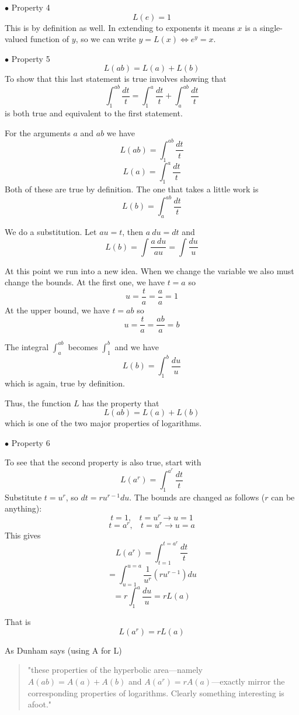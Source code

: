 \documentclass[11pt, oneside]{article}
\begin{document}
$\bullet  $ Property 4
\[ L(e) = 1 \]
This is by definition as well.  In extending to exponents it means $x$ is a single-valued function of $y$, so we can write $y = L(x) \iff e^y = x$.

$\bullet  $ Property 5
\[ L(ab) = L(a) + L(b)  \]
To show that this last statement is true involves showing that
\[ \int_1^{ab} \frac{dt}{t} = \int_1^{a} \frac{dt}{t} + \int_a^{ab} \frac{dt}{t} \]
is both true and equivalent to the first statement.

For the arguments $a$ and $ab$ we have 
\[ L(ab) = \int_1^{ab} \frac{dt}{t}   \]
\[ L(a) = \int_1^{a} \frac{dt}{t}   \]
Both of these are true by definition.  The one that takes a little work is
\[ L(b) = \int_a^{ab} \frac{dt}{t}   \]

We do a substitution.  Let $au=t$, then $a \ du = dt$ and
\[ L(b) = \int \frac{a \ du}{au} = \int \frac{du}{u}  \]

At this point we run into a new idea.  When we change the variable we also must change the bounds.  At the first one, we have $t = a$ so
\[ u = \frac{t}{a} = \frac{a}{a} = 1  \]
At the upper bound, we have $t = ab$ so
\[ u = \frac{t}{a} = \frac{ab}{a} = b  \]

The integral $\int_a^{ab}$ becomes $\int_1^{b}$ and we have
\[ L(b) = \int_1^b \frac{du}{u}  \]
which is again, true by definition.  

Thus, the function $L$ has the property that
\[ L(ab) = L(a) + L(b) \]
which is one of the two major properties of logarithms.

$\bullet  $ Property 6

To see that the second property is also true, start with
\[ L(a^r) = \int_1^{a^r} \frac{dt}{t}   \]
Substitute $t=u^r$, so $dt = ru^{r-1} du$.  The bounds are changed as follows ($r$ can be anything):
\[ t = 1, \ \ \ \  t = u^r \rightarrow  u= 1  \]
\[ t = a^r, \ \ \ \   t = u^r \rightarrow  u = a  \]
This gives
\[ L(a^r) = \int_{t=1}^{t=a^r} \frac{dt}{t} \]
\[ = \int_{u=1}^{u=a} \frac{1}{u^r} (ru^{r-1}) du \]
\[ = r \int_{1}^{a}  \frac{du}{u} = rL(a) \]

That is
\[ L(a^r) = rL(a) \]

As Dunham says (using A for L) 
\begin{quote}"these properties of the hyperbolic area---namely $A(ab) = A(a) + A(b)$ and $A(a^r) = rA(a)$---exactly mirror the corresponding properties of logarithms.  Clearly something interesting is afoot."\end{quote}
\end{document}
